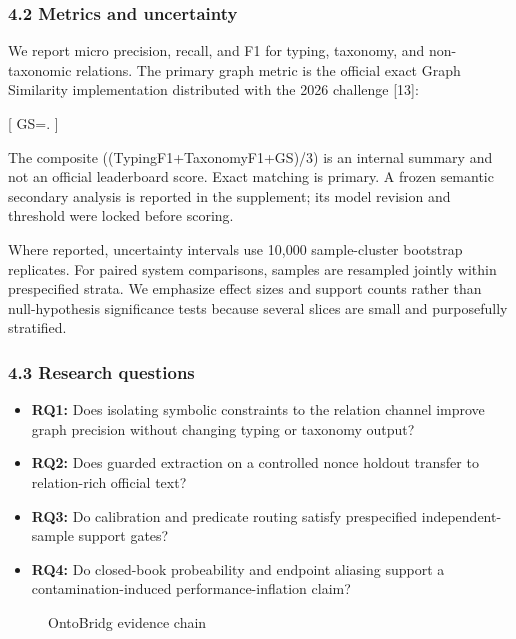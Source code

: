 \documentclass[
]{article}
\makeatletter
\newcommand*\pandocbounded[1]{%
  \sbox\pandoc@box{#1}%
  \Gscale@div\@tempa{\textheight}{\dimexpr\ht\pandoc@box+\dp\pandoc@box\relax}%
  \Gscale@div\@tempb{\linewidth}{\wd\pandoc@box}%
  \ifdim\@tempb\p@<\@tempa\p@\let\@tempa\@tempb\fi%
  \ifdim\@tempa\p@<\p@\scalebox{\@tempa}{\usebox\pandoc@box}%
  \else\usebox{\pandoc@box}%
  \fi%
}
\providecommand{\tightlist}{%
  \setlength{\itemsep}{0pt}\setlength{\parskip}{0pt}}
\makeatother
\begin{document}
\subsubsection{4.2 Metrics and
uncertainty}\label{metrics-and-uncertainty}

We report micro precision, recall, and F1 for typing, taxonomy, and
non-taxonomic relations. The primary graph metric is the official exact
Graph Similarity implementation distributed with the 2026 challenge
{[}13{]}:

{[} GS=. {]}

The composite ((TypingF1+TaxonomyF1+GS)/3) is an internal summary and
not an official leaderboard score. Exact matching is primary. A frozen
semantic secondary analysis is reported in the supplement; its model
revision and threshold were locked before scoring.

Where reported, uncertainty intervals use 10,000 sample-cluster
bootstrap replicates. For paired system comparisons, samples are
resampled jointly within prespecified strata. We emphasize effect sizes
and support counts rather than null-hypothesis significance tests
because several slices are small and purposefully stratified.

\subsubsection{4.3 Research questions}\label{research-questions}

\begin{itemize}
\tightlist
\item
  \textbf{RQ1:} Does isolating symbolic constraints to the relation
  channel improve graph precision without changing typing or taxonomy
  output?
\item
  \textbf{RQ2:} Does guarded extraction on a controlled nonce holdout
  transfer to relation-rich official text?
\item
  \textbf{RQ3:} Do calibration and predicate routing satisfy
  prespecified independent-sample support gates?
\item
  \textbf{RQ4:} Do closed-book probeability and endpoint aliasing
  support a contamination-induced performance-inflation claim?
\end{itemize}

\begin{figure}
\centering
\pandocbounded{}
\caption{OntoBridg evidence chain}
\end{figure}
\end{document}
